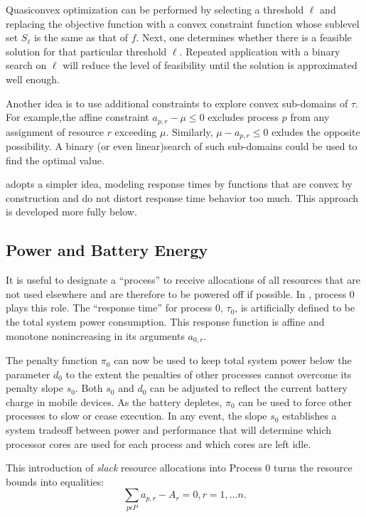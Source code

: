 Quasiconvex optimization can be performed by selecting a threshold $\ell$ and replacing the objective function
with a convex constraint function whose sublevel set $S_\ell$ is the same as that of $f$.
Next, one determines whether there is a feasible solution for that particular threshold $\ell$.
Repeated application with a binary search on $\ell$ will reduce the level of feasibility
until the solution is approximated well enough.

Another idea is to use additional constraints to explore convex sub-domains of $\tau$.
For example,the affine constraint $a_{p,r} - \mu \leq 0$ excludes process $p$ from any assignment of resource $r$ exceeding $\mu$.  Similarly, $\mu - a_{p,r} \leq 0$ exludes the opposite possibility.
A binary (or even linear)search of such sub-domains could be used to find the optimal value.

\pacora adopts a simpler idea, modeling response times by functions that are convex by construction
and do not distort response time behavior too much.  This approach is developed more fully below.

\subsection*{Power and Battery Energy}

It is useful to designate a ``process'' to receive allocations of all resources
that are not used elsewhere and are therefore to be powered off if possible.
In \pacora, process 0 plays this role.
The ``response time'' for process 0, $\tau_0$,
is artificially defined to be the total system power consumption.
This response function is affine and monotone nonincreasing in its arguments $a_{0,r}$.

The penalty function $\pi_0$ can now be used to keep total system power below the parameter $d_0$
to the extent the penalties of other processes cannot overcome its penalty slope $s_0$.
Both $s_0$ and $d_0$ can be adjusted to reflect the current battery charge in mobile devices.
As the battery depletes, $\pi_0$ can be used to force other processes to slow or cease execution.
In any event, the slope $s_0$ establishes a system tradeoff between power and performance that
will determine which processor cores are used for each process and which cores are left idle.

This introduction of \emph{slack} resource allocations into Process 0 turns the resource bounds into equalities:
\begin{displaymath}
\sum_{p\epsilon P} a_{p,r} - A_r = 0, r = 1,\dots n.
\end{displaymath}

